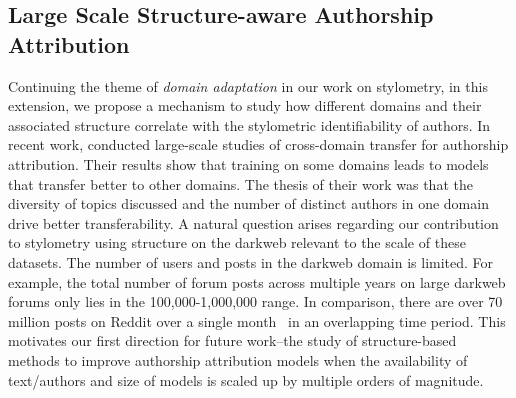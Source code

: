 \subsection{Large Scale Structure-aware Authorship Attribution}
Continuing the theme of \textit{domain adaptation} in our work on stylometry, in this extension, we propose a mechanism to study how different domains and their associated structure correlate with the stylometric identifiability of authors.
In recent work, \citet{barlas2020cross,riverastao2021learning} conducted large-scale studies of cross-domain transfer for authorship attribution. 
Their results show that training on some domains leads to models that transfer better to other domains.
The thesis of their work was that the diversity of topics discussed and the number of distinct authors in one domain drive better transferability.
A natural question arises regarding our contribution to stylometry using structure on the darkweb relevant to the scale of these datasets.
The number of users and posts in the darkweb domain is limited. 
For example, the total number of forum posts across multiple years on large darkweb forums only lies in the 100,000-1,000,000 range.
In comparison, there are over 70 million posts on Reddit over a single month~\cite {andrews2019learning} in an overlapping time period.
This motivates our first direction for future work--the study of structure-based methods to improve authorship attribution models when the availability of text/authors and size of models is scaled up by multiple orders of magnitude.



